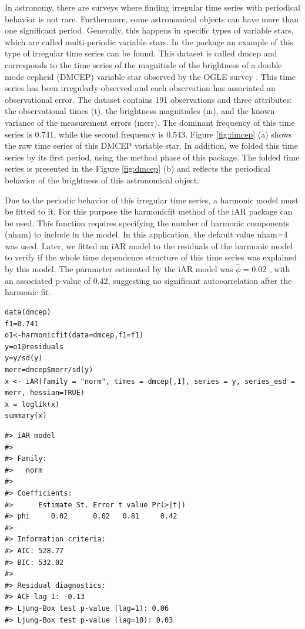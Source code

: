 In astronomy, there are surveys where finding irregular time series with periodical behavior is not rare. Furthermore, some astronomical objects can have more than one significant period. Generally, this happens in specific types of variable stars, which are called multi-periodic variable stars. In the  package an example of this type of irregular time series can be found. This dataset is called dmcep and corresponds to the time series of the magnitude of the brightness of a double mode cepheid (DMCEP) variable star observed by the OGLE survey \citep{OGLE}. This time series has been irregularly observed and each observation has associated an observational error. The dataset contains 191 observations and three attributes: the observational times (t), the brightness magnitudes (m), and the known variance of the measurement errors (merr). The dominant frequency of this time series is 0.741, while the second frequency is 0.543. Figure \ref{fig:dmcep} (a) shows the raw time series of this DMCEP variable star. In addition, we folded this time series by its first period, using the method phase of this package. The folded time series is presented in the Figure \ref{fig:dmcep} (b) and reflects the periodical behavior of the brightness of this astronomical object.

Due to the periodic behavior of this irregular time series, a harmonic model must be fitted to it. For this purpose the harmonicfit method of the iAR package can be used. This function requires specifying the number of harmonic components (nham) to include in the model. In this application, the default value nham=4 was used. Later, we fitted an iAR model to the residuals of the harmonic model to verify if the whole time dependence structure of this time series was explained by this model. The parameter estimated by the iAR model was \(\hat{\phi} = 0.02\) , with an associated p-value of 0.42, suggesting no significant autocorrelation after the harmonic fit.

\begin{verbatim}
data(dmcep)
f1=0.741
o1<-harmonicfit(data=dmcep,f1=f1)
y=o1@residuals
y=y/sd(y)
merr=dmcep$merr/sd(y)
x <- iAR(family = "norm", times = dmcep[,1], series = y, series_esd = merr, hessian=TRUE)
x = loglik(x)
summary(x)
\end{verbatim}

\begin{verbatim}
#> iAR model
#> 
#> Family:
#>   norm 
#> 
#> Coefficients:
#>      Estimate St. Error t value Pr(>|t|)
#> phi     0.02      0.02   0.81     0.42
#> 
#> Information criteria:
#> AIC: 528.77 
#> BIC: 532.02 
#> 
#> Residual diagnostics:
#> ACF lag 1: -0.13 
#> Ljung-Box test p-value (lag=1): 0.06 
#> Ljung-Box test p-value (lag=10): 0.03
\end{verbatim}


